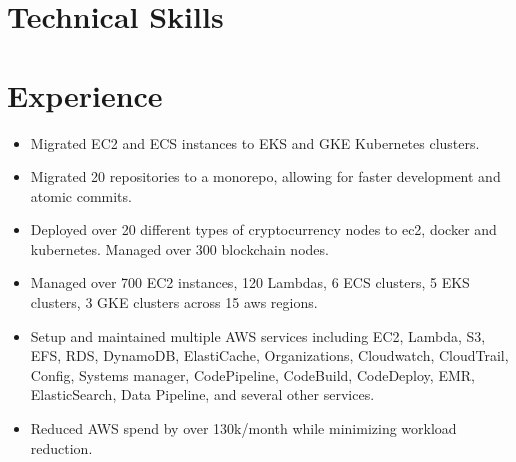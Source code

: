 \documentclass[10pt,a4paper,roman]{moderncv} %
\begin{document}


\makecvtitle %


\section{Technical Skills}






\section{Experience}
{
\begin{itemize}
\item Migrated EC2 and ECS instances to EKS and GKE Kubernetes clusters.
\item Migrated 20 repositories to a monorepo, allowing for faster development and atomic commits.
\item Deployed over 20 different types of cryptocurrency nodes to ec2, docker and kubernetes. Managed over 300 blockchain nodes. 
\item Managed over 700 EC2 instances, 120 Lambdas, 6 ECS clusters, 5 EKS clusters, 3 GKE clusters across 15 aws regions.
\item Setup and maintained multiple AWS services including EC2, Lambda, S3, EFS, RDS, DynamoDB, ElastiCache, Organizations, Cloudwatch, CloudTrail, Config, Systems manager, CodePipeline, CodeBuild, CodeDeploy, EMR, ElasticSearch, Data Pipeline, and several other services.
\item Reduced AWS spend by over 130k/month while minimizing workload reduction.
\end{itemize}}
\end{document}
